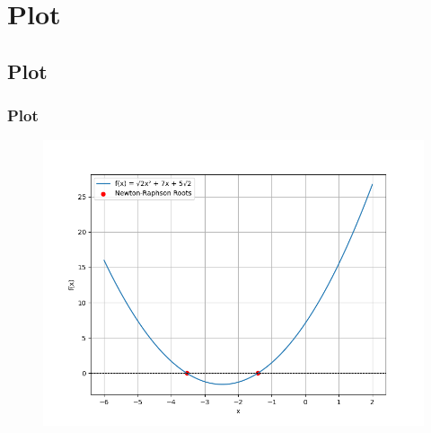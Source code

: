 \documentclass{beamer}
\theoremstyle{remark}
\numberwithin{equation}{section}
\begin{document}
\section{Plot}
\subsection{Plot}
\begin{frame}
\frametitle{Plot}

\begin{figure}[h!]
   \centering
   \includegraphics[width=0.7\linewidth]{figs/Figure_1.png}
\end{figure}

\end{frame}
\end{document}
